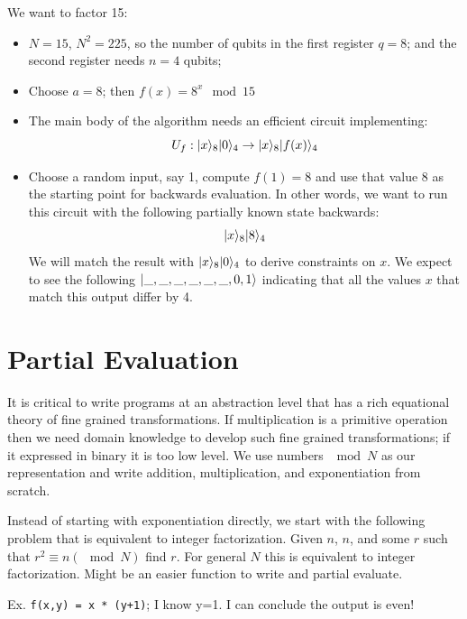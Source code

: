\documentclass{article}
\begin{document}
We want to factor 15:
\begin{itemize}
\item $N = 15$, $N^2 = 225$, so the number of qubits in the first
  register $q=8$; and the second register needs $n=4$ qubits;
\item Choose $a=8$; then $f(x) = 8^x \mod{15}$
\item The main body of the algorithm needs an efficient circuit implementing:
  \[
  U_f : | x \rangle_8| 0 \rangle_4 \rightarrow | x \rangle_8| f(x) \rangle_4
  \]
\item Choose a random input, say 1, compute $f(1) = 8$ and use that
  value 8 as the starting point for backwards evaluation. In other
  words, we want to run this circuit with the following partially
  known state backwards:
  \[
  | x \rangle_8| 8 \rangle_4
  \]
  We will match the result with $| x \rangle_8| 0 \rangle_4$ to derive
  constraints on $x$. We expect to see the following
  $| \_,\_,\_,\_,\_,\_,0,1 \rangle$ indicating that all the values $x$ that match
  this output differ by 4.
\end{itemize}


\section{Partial Evaluation}

It is critical to write programs at an abstraction level that has a
rich equational theory of fine grained transformations. If
multiplication is a primitive operation then we need domain knowledge
to develop such fine grained transformations; if it expressed in
binary it is too low level. We use numbers $\mod{N}$ as our
representation and write addition, multiplication, and exponentiation
from scratch.


Instead of starting with exponentiation directly, we start with the
following problem that is equivalent to integer factorization. Given
$n$, $n$, and some $r$ such that $r^2 \equiv n (\mod{N})$ find
$r$. For general $N$ this is equivalent to integer
factorization. Might be an easier function to write and partial
evaluate.

Ex. \verb|f(x,y) = x * (y+1)|; I know y=1. I can conclude the output is even!
\end{document}
